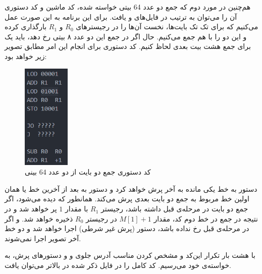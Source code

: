 \documentclass[12pt,onecolumn,a4paper,fleqn]{article}
\begin{document}
	هم‌چنین در مورد دوم که جمع دو عدد 64 بیتی خواسته شده، کد ماشین و کد دستوری آن را می‌توان به ترتیب در فایل‌های 
و
یافت. برای این برنامه به این صورت عمل می‌کنیم که برای تک تک بایت‌ها، نخست آن‌ها را در رجیستر‌های $R_0$ و $R_1$ بارگذاری کرده و این دو را با هم جمع می‌کنیم. حال اگر در جمع این دو عدد ۸ بیتی
رخ دهد، باید یک  برای جمع هشت بیت بعدی لحاظ کنیم. کد دستوری برای انجام این امر مطابق تصویر زیر خواهد بود:
\begin{figure}[H]
	\centering
	\includegraphics[width=0.2\textwidth]{source/sum.png}
	\caption{کد دستوری جمع دو بایت از دو عدد 64 بینی}
	\label{fig:sum}
\end{figure}
\noindent
دستور  به خط یکی مانده به آخر پرش خواهد کرد و دستور  به بعد از آخرین خط یا همان اولین خط مربوط به جمع دو بایت بعدی پرش می‌کند. همانطور که دیده می‌شود، اگر جمع دو بایت در مرحله‌ی قبل  داشته باشد، رجیستر $R_1$ با مقدار $1$ پر خواهد شد و در نتیجه در جمع در خط دوم کد، مقدار $M[1] + 1$ در رجیستر $R_0$ ذخیره خواهد شد. و اگر در مرحله‌ی قبل  رخ نداده باشد، دستور  (پرش غیر شرطی) اجرا خواهد شد و دو خط آخر تصویر اجرا نمی‌شوند. 

با هشت بار تکرار این‌کد و مشخص کردن مناسب آدرس جلوی  و  و دستور‌های پرش، به خواسته‌ی خود می‌رسیم. کد کامل را در فایل ذکر شده در بالاتر می‌توان یافت.
\end{document}
